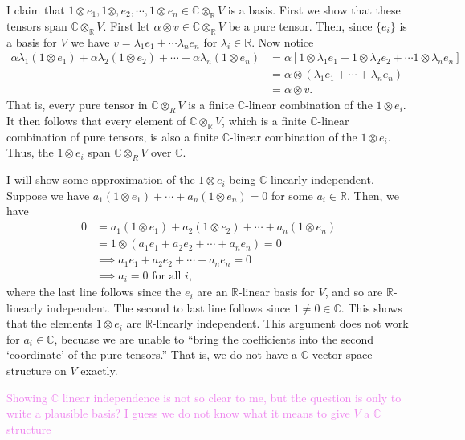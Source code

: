 \documentclass[12pt,letterpaper,boxed]{hmcpset}
\newcommand{\wg}[1]{\textcolor{violet}{#1}}
\newcommand{\R}{\mathbb R}
\newcommand{\C}{\mathbb C}
\begin{document}
\begin{solution}
\item I claim that $1 \otimes e_1, 1 \otimes, e_2, \cdots, 1 \otimes
e_n \in \C \otimes_\R V$ is a basis. First we show that these tensors
span $\C \otimes_\R V$. First let $\alpha \otimes v \in \C \otimes_\R
V$ be a pure tensor. Then, since $\{e_i\}$ is a basis for $V$ we have
$v = \lambda_1 e_1 + \cdots \lambda_n e_n$ for $\lambda_i \in \R$.
Now notice 
\begin{align*}
	\alpha\lambda_1(1 \otimes e_1) + \alpha\lambda_2(1 \otimes e_2)
		+ \cdots + \alpha\lambda_n(1 \otimes e_n) 
	&= \alpha 
	\left[ 1 \otimes \lambda_1 e_1 + 1 \otimes \lambda_2 e_2 + \cdots 1 \otimes \lambda_n e_n \right] \\
	&=  \alpha \otimes (\lambda_1 e_1 + \cdots + \lambda_n e_n) \\
	&=  \alpha \otimes v.
\end{align*}
That is, every pure tensor in $\C \otimes_R V$ is a finite $\C$-linear
combination of the $1 \otimes e_i$. It then follows that every element
of $\C \otimes_\R V$, which is a finite $\C$-linear combination of
pure tensors, is also a finite $\C$-linear combination of the $1
\otimes e_i$. Thus, the $1 \otimes e_i$ span $\C \otimes_R V$ over
$\C$. 

I will show some approximation of the $1 \otimes e_i$ being
$\C$-linearly independent. Suppose we have $a_1(1 \otimes e_1) +
\cdots + a_n(1 \otimes e_n) = 0$ for some $a_i \in \R$. Then, we have
\begin{align*}
	0 &= a_1(1 \otimes e_1) + a_2(1 \otimes e_2) + \cdots + a_n(1 \otimes e_n) \\
	&= 1 \otimes (a_1 e_1 + a_2 e_2 + \cdots + a_n e_n) = 0 \\
	&\implies a_1 e_1 + a_2 e_2 + \cdots + a_n e_n = 0 \\
	&\implies a_i = 0 \text{ for all $i$,}
\end{align*}
where the last line follows since the $e_i$ are an $\R$-linear basis
for $V$, and so are $\R$-linearly independent. The second to last line
follows since $1 \neq 0 \in \C$. 
This shows that the elements $1 \otimes e_i$ are $\R$-linearly
independent. This argument does not work for $a_i \in \C$, becuase we
are unable to ``bring the coefficients into the second `coordinate'
of the pure tensors.'' That is, we do not have a $\C$-vector space
structure on $V$ exactly.



\wg{Showing $\C$ linear independence is not so clear to me, but the
question is only to write a plausible basis? I guess we do not know
what it means to give $V$ a $\mathbb C$ structure}



\end{solution}

\newpage


\begin{problem}[4]
	\hfill
\end{problem}

\begin{solution}
\end{solution}

\newpage
\end{document}
